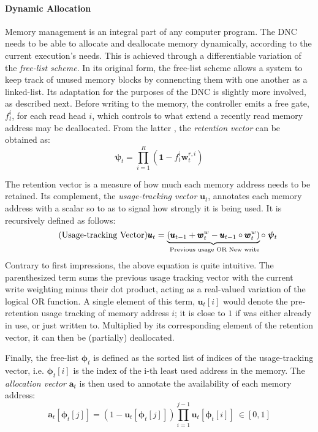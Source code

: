 \documentclass[]{article}
\begin{document}
\paragraph{Dynamic Allocation} Memory management is an integral part of any computer program. The DNC needs to be able to allocate and deallocate memory dynamically, according to the current execution's needs. This is achieved through a differentiable variation of the \textit{free-list scheme}. In its original form, the free-list scheme allows a system to keep track of unused memory blocks by connencting them with one another as a linked-list. Its adaptation for the purposes of the DNC is slightly more involved, as described next. Before writing to the memory, the controller emits a free gate, $f_t^i$, for each read head $i$, which controls to what extend a recently read memory address may be deallocated. From the latter , the \textit{retention vector} can be obtained as:
\[
\tag{Retention Vector}
\pmb{\psi}_t = \prod\limits_{i=1}^{R}{(\pmb{1}-f_t^i \pmb{w}_t^{r,i})}
\]

The retention vector is a measure of how much each memory address needs to be retained. Its complement, the \textit{usage-tracking vector} $\pmb{u}_t$, annotates each memory address with a scalar so to as to signal how strongly it is being used. It is recursively defined as follows:
\[
\tag{Usage-tracking Vector}
\pmb{u}_t = \underbrace{(\pmb{u}_{t-1} + \pmb{w}_{t}^{w} - \pmb{u}_{t-1} \circ \pmb{w}_t^{w})}_{\text{ \scriptsize Previous usage OR New write}} \circ \ \pmb{\psi}_t
\]
Contrary to first impressions, the above equation is quite intuitive. The parenthesized term sums the previous usage tracking vector with the current write weighting minus their dot product, acting as a real-valued variation of the logical OR function. A single element of this term, $\pmb{u}_t[i]$ would denote the pre-retention usage tracking of memory address $i$; it is close to $1$ if was either already in use, or just written to. Multiplied by its corresponding element of the retention vector, it can then be (partially) deallocated.
 
Finally, the free-list $\pmb{\phi}_t$ is defined as the sorted list of indices of the usage-tracking vector, i.e. $\pmb{\phi}_t[i]$ is the index of the i-th least used address in the memory. The \textit{allocation vector} $\pmb{a}_t$ is then  used to annotate the availability of each memory address:
\[
\tag{Allocation Vector}
\label{eqn:Allocation Vector}
\pmb{a}_t[\pmb{\phi}_t[j]] = (1 - \pmb{u}_t[\pmb{\phi}_t[j]])\prod\limits_{i=1}^{j-1}{\pmb{u}_t[\pmb{\phi}_t[i]]} \ \in [0,1]
\]
\end{document}
